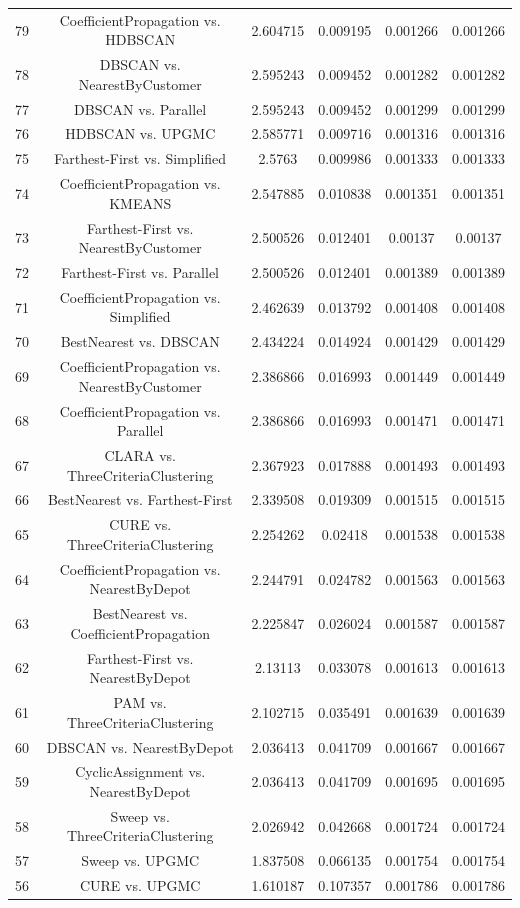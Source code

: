 \documentclass[a4paper,10pt]{article}
\begin{document}
\begin{landscape}
\begin{table}[!htp]
\begin{tabular}{cccccc}
79&CoefficientPropagation vs. HDBSCAN&2.604715&0.009195&0.001266&0.001266\\
78&DBSCAN vs. NearestByCustomer&2.595243&0.009452&0.001282&0.001282\\
77&DBSCAN vs. Parallel&2.595243&0.009452&0.001299&0.001299\\
76&HDBSCAN vs. UPGMC&2.585771&0.009716&0.001316&0.001316\\
75&Farthest-First vs. Simplified&2.5763&0.009986&0.001333&0.001333\\
74&CoefficientPropagation vs. KMEANS&2.547885&0.010838&0.001351&0.001351\\
73&Farthest-First vs. NearestByCustomer&2.500526&0.012401&0.00137&0.00137\\
72&Farthest-First vs. Parallel&2.500526&0.012401&0.001389&0.001389\\
71&CoefficientPropagation vs. Simplified&2.462639&0.013792&0.001408&0.001408\\
70&BestNearest vs. DBSCAN&2.434224&0.014924&0.001429&0.001429\\
69&CoefficientPropagation vs. NearestByCustomer&2.386866&0.016993&0.001449&0.001449\\
68&CoefficientPropagation vs. Parallel&2.386866&0.016993&0.001471&0.001471\\
67&CLARA vs. ThreeCriteriaClustering&2.367923&0.017888&0.001493&0.001493\\
66&BestNearest vs. Farthest-First&2.339508&0.019309&0.001515&0.001515\\
65&CURE vs. ThreeCriteriaClustering&2.254262&0.02418&0.001538&0.001538\\
64&CoefficientPropagation vs. NearestByDepot&2.244791&0.024782&0.001563&0.001563\\
63&BestNearest vs. CoefficientPropagation&2.225847&0.026024&0.001587&0.001587\\
62&Farthest-First vs. NearestByDepot&2.13113&0.033078&0.001613&0.001613\\
61&PAM vs. ThreeCriteriaClustering&2.102715&0.035491&0.001639&0.001639\\
60&DBSCAN vs. NearestByDepot&2.036413&0.041709&0.001667&0.001667\\
59&CyclicAssignment vs. NearestByDepot&2.036413&0.041709&0.001695&0.001695\\
58&Sweep vs. ThreeCriteriaClustering&2.026942&0.042668&0.001724&0.001724\\
57&Sweep vs. UPGMC&1.837508&0.066135&0.001754&0.001754\\
56&CURE vs. UPGMC&1.610187&0.107357&0.001786&0.001786\\

\end{tabular}
\end{table}
\end{landscape}
\end{document}
